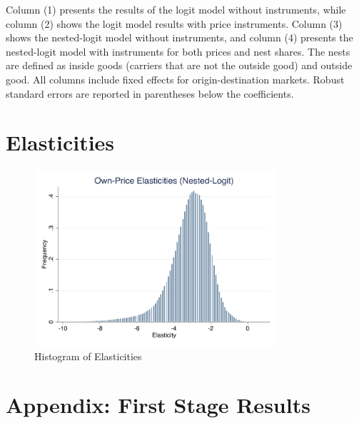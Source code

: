 \documentclass{article}
\begin{document}
Column (1) presents the results of the logit model without instruments,
while column (2) shows the logit model results with price instruments. 
Column (3) shows the nested-logit model without instruments, and 
column (4) presents the nested-logit model with instruments for both prices and nest shares.  The nests are defined as inside goods (carriers that are not the outside good) and outside good.
All columns include fixed effects for origin-destination markets. Robust standard errors are reported in parentheses below the coefficients.




\section{Elasticities}
\centering



\begin{figure}[htbp]
    \centering
    \includegraphics[width=0.8\textwidth]{../src/output/elasticity_logit_histogram.pdf}
    \caption{Histogram of Elasticities}
\end{figure}

\pagebreak
\section{Appendix: First Stage Results}



\end{document}

